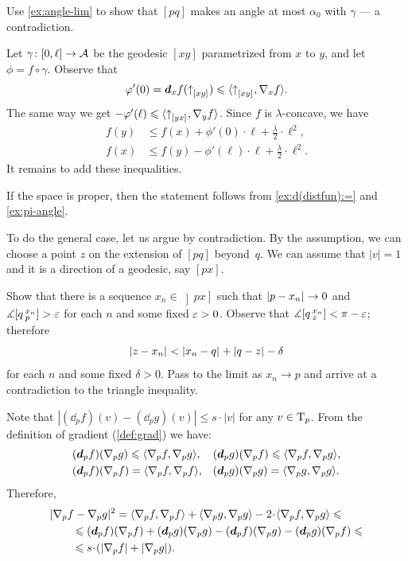 Use \ref{ex:angle-lim} to show that $[pq]$ makes an angle at most $\alpha_0$ with $\gamma$ --- a contradiction.
 
Let $\gamma\colon[0,\ell]\to \mathcal{A}$ be the geodesic $[xy]$ parametrized from $x$ to $y$,
and let $\phi=f\circ\gamma$.
Observe that 
\[\varphi'(0)=\bm{d}_xf({\uparrow}_{[{x}{y}]_{{}}})\leqslant \langle{\uparrow}_{[{x}{y}]_{{}}},\nabla_{x}f\rangle.\]
The same way we get $-\varphi'(\ell)\leqslant \langle{\uparrow}_{[{y}{x}]_{{}}},\nabla_{y}f\rangle$.
Since $f$ is $\lambda$-concave, we have
\begin{align*}
f(y)&\le f(x)+\phi'(0)\cdot \ell+\tfrac\lambda2\cdot\ell^2,
\\
f(x)&\le f(y)-\phi'(\ell)\cdot \ell+\tfrac\lambda2\cdot\ell^2.
\end{align*}
It remains to add these inequalities.

If the space is proper, then the statement follows from \ref{ex:d(distfun):=} and \ref{ex:pi-angle}.

To do the general case, let us argue by contradiction.
By the assumption, we can choose a point $z$ on the extension of $[pq]$ beyond~$q$.
We can assume that $|v|=1$ and it is a direction of a geodesic, say $[px]$.

Show that there is a sequence $x_n\in \left]px\right]$ such that $\dist{p}{x_n}{}\to0$ and
$\measuredangle [q\,{}^{x_n}_{p}]>\varepsilon$ for each $n$ and some fixed $\varepsilon>0$.
Observe that $\mangle\hinge q{x_n}z\z<\pi-\eps$; therefore
\[\dist{z}{x_n}{}<\dist{x_n}{q}{}+\dist{q}{z}{}-\delta\]
for each $n$ and some fixed $\delta>0$.
Pass to the limit as $x_n\to p$ and arrive at a contradiction to the triangle inequality.

Note that
$|(\dd_p f)(v)-(\dd_p g)(v)|\le s\cdot|v|$
for any $v\in \mathrm{T}_p$.
From the definition of gradient (\ref{def:grad}) we have:
\begin{align*}
&(\bm{d}_p f)(\nabla_p g)\leqslant\langle\nabla_p f,\nabla_p g\rangle,
&&(\bm{d}_p g)(\nabla_p f)\leqslant\langle\nabla_p f,\nabla_p g\rangle,
\\
&(\bm{d}_p f)(\nabla_p f)=\langle\nabla_p f,\nabla_p f\rangle,
&&(\bm{d}_p g)(\nabla_p g)=\langle\nabla_p g,\nabla_p g\rangle.
\end{align*}
Therefore,
\begin{align*}
&\dist[2]{\nabla_pf}{\nabla_pg}{}
=\<\nabla_p f,\nabla_p f\>+\<\nabla_p g,\nabla_p g\>-2\cdot\<\nabla_p f,\nabla_p g\>
\le
\\
&\qquad\le (\dd_p f)(\nabla_p f)+(\dd_p g)(\nabla_p g)-
(\dd_p f)(\nabla_p g)-(\dd_p g)(\nabla_p f)
\le
\\
&\qquad\le s\cdot(|\nabla_p f|+|\nabla_p g|).
\end{align*}

